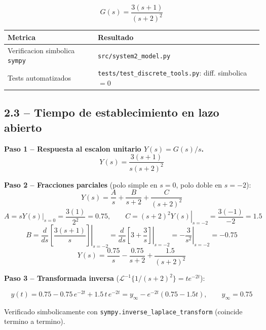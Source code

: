 \documentclass[11pt]{article}
\begin{document}
\begin{resultbox}
\begin{equation}
\boxed{G(s)=\dfrac{3(s+1)}{(s+2)^2}}
\end{equation}
\end{resultbox}

\begin{center}
\begin{tabular}{@{}ll@{}}
\toprule
Metrica & Resultado \\
\midrule
Verificacion simbolica \texttt{sympy} & \texttt{src/system2\_model.py} \\
Tests automatizados & \texttt{tests/test\_discrete\_tools.py}: diff. simbolica $=0$ \\
\bottomrule
\end{tabular}
\end{center}

\subsection{2.3 -- Tiempo de establecimiento en lazo abierto}

\textbf{Paso 1 -- Respuesta al escalon unitario $Y(s)=G(s)/s$.}
\begin{equation}
Y(s)=\frac{3(s+1)}{s(s+2)^2}
\end{equation}

\textbf{Paso 2 -- Fracciones parciales} (polo simple en $s=0$, polo doble en $s=-2$):
\begin{equation}
Y(s)=\frac{A}{s}+\frac{B}{s+2}+\frac{C}{(s+2)^2}
\end{equation}
\begin{equation}
A=\left.sY(s)\right|_{s=0}=\frac{3(1)}{2^2}=0.75,\qquad
C=\left.(s+2)^2Y(s)\right|_{s=-2}=\frac{3(-1)}{-2}=1.5
\end{equation}
\begin{equation}
B=\left.\frac{d}{ds}\!\left[\frac{3(s+1)}{s}\right]\right|_{s=-2}
=\left.\frac{d}{ds}\!\left[3+\frac3s\right]\right|_{s=-2}
=\left.-\frac{3}{s^2}\right|_{s=-2}=-0.75
\end{equation}
\begin{equation}
Y(s)=\frac{0.75}{s}-\frac{0.75}{s+2}+\frac{1.5}{(s+2)^2}
\end{equation}

\textbf{Paso 3 -- Transformada inversa} ($\mathcal L^{-1}\{1/(s+2)^2\}=te^{-2t}$):
\begin{resultbox}
\begin{equation}
y(t)=0.75-0.75\,e^{-2t}+1.5\,t\,e^{-2t}=y_\infty-e^{-2t}(0.75-1.5t),\qquad y_\infty=0.75
\end{equation}
\end{resultbox}
Verificado simbolicamente con \texttt{sympy.inverse\_laplace\_transform} (coincide termino a termino).
\end{document}
